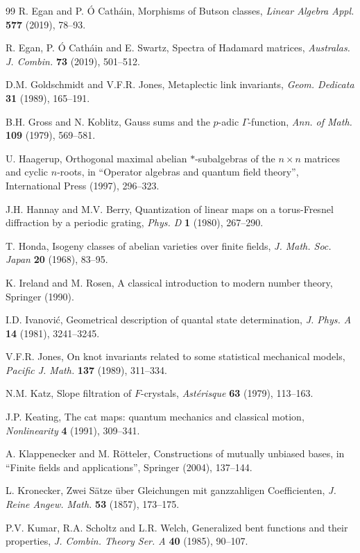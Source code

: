 \documentclass[11pt]{amsart}
\theoremstyle{definition}
\begin{document}
\begin{thebibliography}{99}
R. Egan and P. \'O Cath\'ain, Morphisms of Butson classes, {\em Linear Algebra Appl.} {\bf 577} (2019), 78--93.

R. Egan, P. \'O Cath\'ain and E. Swartz, Spectra of Hadamard matrices, {\em Australas. J. Combin.} {\bf 73} (2019), 501--512.

D.M. Goldschmidt and V.F.R. Jones, Metaplectic link invariants, {\em Geom. Dedicata} {\bf 31} (1989), 165--191.

B.H. Gross and N. Koblitz, Gauss sums and the $p$-adic $\Gamma$-function, {\em Ann. of Math.} {\bf 109} (1979), 569--581.

U. Haagerup, Orthogonal maximal abelian $*$-subalgebras of the $n\times n$ matrices and cyclic $n$-roots, in ``Operator algebras and quantum field theory'', International Press (1997), 296--323.

J.H. Hannay and M.V. Berry, Quantization of linear maps on a torus-Fresnel diffraction by a periodic grating, {\em Phys. D} {\bf 1} (1980), 267--290.

T. Honda, Isogeny classes of abelian varieties over finite fields, {\em J. Math. Soc. Japan} {\bf 20} (1968), 83--95.

K. Ireland and M. Rosen, A classical introduction to modern number theory, Springer (1990).

I.D. Ivanovi\'c, Geometrical description of quantal state determination, {\em J. Phys. A} {\bf 14} (1981), 3241--3245.

V.F.R. Jones, On knot invariants related to some statistical mechanical models, {\em Pacific J. Math.} {\bf 137} (1989), 311--334.

N.M. Katz, Slope filtration of $F$-crystals, {\em Ast\'erisque} {\bf 63} (1979), 113--163.

J.P. Keating, The cat maps: quantum mechanics and classical motion, {\em Nonlinearity} {\bf 4} (1991), 309--341.

A. Klappenecker and M. R\"otteler, Constructions of mutually unbiased bases, in ``Finite fields and applications'', Springer (2004), 137--144.

L. Kronecker, Zwei S\"atze \"uber Gleichungen mit ganzzahligen Coefficienten, {\em J. Reine Angew. Math.} {\bf 53} (1857), 173--175.

P.V. Kumar, R.A. Scholtz and L.R. Welch, Generalized bent functions and their properties, {\em J. Combin. Theory Ser. A} {\bf 40} (1985), 90--107.


\end{thebibliography}
\end{document}
